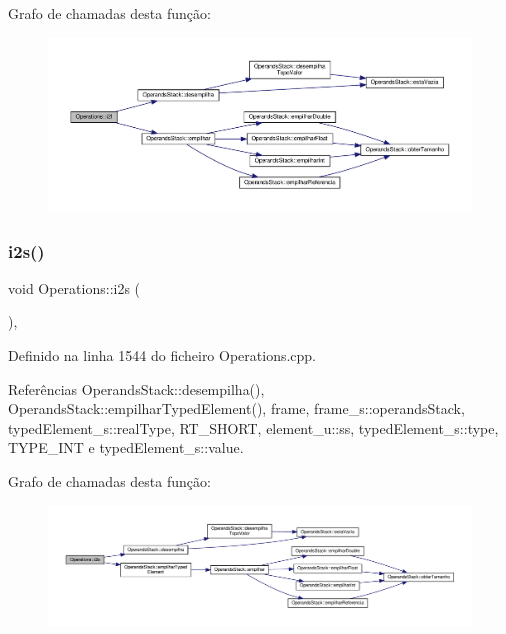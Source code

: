 Grafo de chamadas desta função\+:\nopagebreak
\begin{figure}[H]
\begin{center}
\leavevmode
\includegraphics[width=350pt]{classOperations_ae5d28665a74411cbb880e3007c5405e8_cgraph}
\end{center}
\end{figure}
\mbox{\label{classOperations_ab83ebb06495a6e42c5edeec05e312f8c}} 
\subsubsection{\texorpdfstring{i2s()}{i2s()}}
{\footnotesize\ttfamily void Operations\+::i2s (\begin{DoxyParamCaption}{ }\end{DoxyParamCaption})\hspace{0.3cm}{\ttfamily [static]}, {\ttfamily [private]}}



Definido na linha 1544 do ficheiro Operations.\+cpp.



Referências Operands\+Stack\+::desempilha(), Operands\+Stack\+::empilhar\+Typed\+Element(), frame, frame\+\_\+s\+::operands\+Stack, typed\+Element\+\_\+s\+::real\+Type, R\+T\+\_\+\+S\+H\+O\+RT, element\+\_\+u\+::ss, typed\+Element\+\_\+s\+::type, T\+Y\+P\+E\+\_\+\+I\+NT e typed\+Element\+\_\+s\+::value.

Grafo de chamadas desta função\+:\nopagebreak
\begin{figure}[H]
\begin{center}
\leavevmode
\includegraphics[width=350pt]{classOperations_ab83ebb06495a6e42c5edeec05e312f8c_cgraph}
\end{center}
\end{figure}
\mbox{\label{classOperations_a12d5933f0d0c91c578b76edb1971a2be}} 
